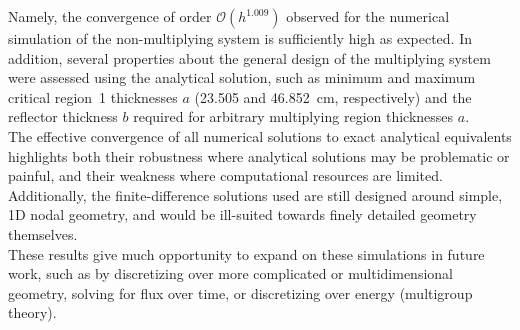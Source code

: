 \documentclass[12pt]{article}
\newcommand{\bigO}{\mathcal{O}}
\begin{document}
Namely, the convergence of order $\bigO(h^{1.009})$ observed for the numerical simulation of the non-multiplying system is sufficiently high as expected.
In addition, several properties about the general design of the multiplying system were assessed using the analytical solution, such as minimum and maximum critical region~1 thicknesses $a$ (23.505 and 46.852~cm, respectively) and the reflector thickness $b$ required for arbitrary multiplying region thicknesses $a$.\\

The effective convergence of all numerical solutions to exact analytical equivalents highlights both their robustness where analytical solutions may be problematic or painful, and their weakness where computational resources are limited.
Additionally, the finite-difference solutions used are still designed around simple, 1D nodal geometry, and would be ill-suited towards finely detailed geometry themselves.\\

These results give much opportunity to expand on these simulations in future work, such as by discretizing over more complicated or multidimensional geometry, solving for flux over time, or discretizing over energy (multigroup theory).

% 
\pagebreak\printbibliography

\appendix
\pagebreak
\end{document}
